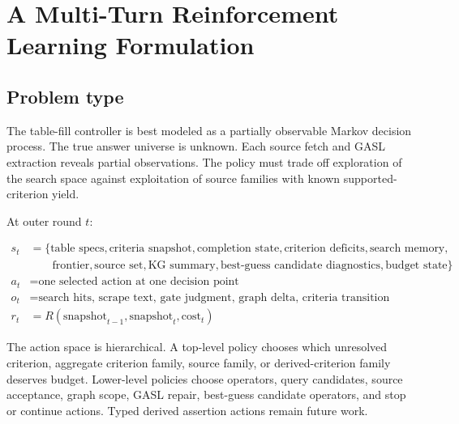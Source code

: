 \documentclass[11pt]{article}
\begin{document}
\section{A Multi-Turn Reinforcement Learning Formulation}

\subsection{Problem type}

The table-fill controller is best modeled as a partially observable Markov
decision process.  The true answer universe is unknown.  Each source fetch and
GASL extraction reveals partial observations.  The policy must trade off
exploration of the search space against exploitation of source families with
known supported-criterion yield.

At outer round \(t\):

\begin{align*}
s_t &= \{\text{table specs}, \text{criteria snapshot}, \text{completion state},
\text{criterion deficits}, \text{search memory},\\
&\quad\quad \text{frontier}, \text{source set}, \text{KG summary},
\text{best-guess candidate diagnostics}, \text{budget state}\}\\
a_t &= \text{one selected action at one decision point}\\
o_t &= \text{search hits, scrape text, gate judgment, graph delta,
criteria transition}\\
r_t &= R(\text{snapshot}_{t-1}, \text{snapshot}_{t}, \text{cost}_{t})
\end{align*}

The action space is hierarchical.  A top-level policy chooses which unresolved
criterion, aggregate criterion family, source family, or derived-criterion
family deserves budget.  Lower-level policies choose operators, query
candidates, source acceptance, graph scope, GASL repair, best-guess candidate
operators, and stop or continue actions.  Typed derived assertion actions
remain future work.
\end{document}
